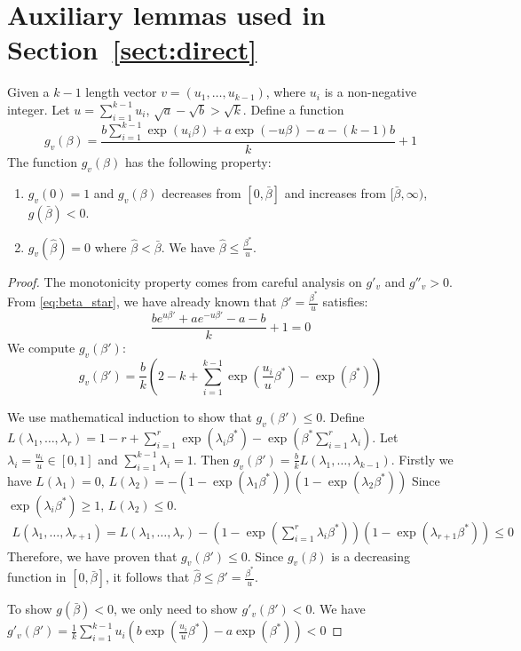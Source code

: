 \documentclass{article}
\begin{document}
\section{Auxiliary lemmas used in Section~\ref{sect:direct}}\label{ap:6}
\begin{lemma}\label{lem:g_v_extension}
	Given a $k-1$ length vector $v=(u_1, \dots, u_{k-1})$, where $u_i$ is a non-negative integer.
	Let $u=\sum_{i=1}^{k-1} u_i$, $\sqrt{a} - \sqrt{b} > \sqrt{k}$.
	Define a function
	\begin{equation}\label{eq:gvbeta}
	g_v(\beta) = \frac{b\sum_{i=1}^{k-1}\exp(u_i \beta) + a \exp(-u\beta) - a - (k-1)b}{k}+1
	\end{equation}
	The function $g_v(\beta)$ has the following property:
	\begin{enumerate}
		\item $g_v(0)=1$ and $g_v(\beta)$ decreases from $[0, \bar{\beta}]$ and increases from
		$[\bar{\beta}, \infty)$, $g(\bar{\beta}) < 0$.
		\item $g_v(\hat{\beta}) = 0$ where $\hat{\beta} < \bar{\beta}$. We have $\hat{\beta} \leq \frac{\beta^*}{u}$.
	\end{enumerate}
\end{lemma}
\begin{proof}
	The monotonicity property comes from careful analysis on $g'_v$ and $g''_v>0$.
	From \eqref{eq:beta_star}, we have already known that $\beta' = \frac{\beta^*}{u}$ satisfies:
	$$
	\frac{b e^{u\beta'} + a e^{-u\beta'}-a-b}{k}+1=0
	$$
	We compute $g_v(\beta')$:
	$$
	g_v(\beta') = \frac{b}{k}(2-k + \sum_{i=1}^{k-1}\exp(\frac{u_i}{u} \beta^*) - \exp(\beta^*))
	$$
	
	We use mathematical induction to show that $g_v(\beta') \leq 0$.
	Define $L(\lambda_1, \dots, \lambda_r) = 1-r + \sum_{i=1}^{r} \exp(\lambda_i \beta^*) - \exp(\beta^*\sum_{i=1}^{r} \lambda_i )$.
	Let $\lambda_i = \frac{u_i}{u} \in [0,1]$ and $\sum_{i=1}^{k-1} \lambda_i = 1$.
	Then $g_v(\beta') =\frac{b}{k} L(\lambda_1, \dots, \lambda_{k-1})$.
	Firstly we have $L(\lambda_1) = 0$,
	$
	L(\lambda_2) = -(1-\exp(\lambda_1 \beta^*))(1-\exp(\lambda_2 \beta^*))
	$
	Since $\exp(\lambda_i \beta^*) \geq 1$, $L(\lambda_2)\leq 0$.
	\begin{align*}
	L(\lambda_1, \dots, \lambda_{r+1}) = L(\lambda_1, \dots, \lambda_r) - (1-\exp(\sum_{i=1}^r \lambda_i \beta^*)) (1-\exp(\lambda_{r+1}\beta^*)) \leq 0
	\end{align*}
	Therefore, we have proven that $g_v(\beta') \leq 0$. Since $g_v(\beta)$
	is a decreasing function in $[0, \bar{\beta}]$, it follows that
	$\hat{\beta} \leq \beta' = \frac{\beta^*}{u}$.
	
	To show $g(\bar{\beta}) < 0$, we only need to show $g'_v(\beta') < 0$.
	We have $g'_v(\beta') = \frac{1}{k} \sum_{i=1}^{k-1} u_i(b\exp(\frac{u_i}{u}\beta^*) - a\exp(\beta^*)) < 0$
\end{proof}
\end{document}
